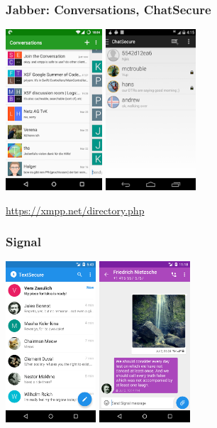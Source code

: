 \begin{frame}
  \frametitle{Jabber: Conversations, ChatSecure}
    \begin{center}
      \includegraphics[height=6cm]{../../img/conversations.png}
      \hspace{0.5cm}
      \includegraphics[height=6cm]{../../img/chatsecure.png}
    \end{center}
    \url{https://xmpp.net/directory.php}
\end{frame}

\begin{frame}
  \frametitle{Signal}
    \begin{center}
      \includegraphics[height=6cm]{../../img/signal1.png}
      \hspace{0.5cm}
      \includegraphics[height=6cm]{../../img/signal2.png}
    \end{center}
\end{frame}

